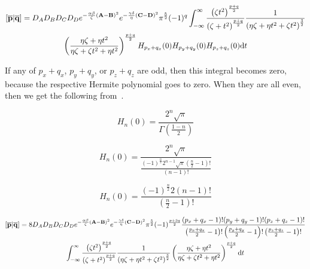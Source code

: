 \begin{multline}
  \left[\overline{\mathbf{p}}\middle|\overline{\mathbf{q}}\right] = D_AD_BD_CD_D e^{-\frac{\alpha\beta}{\zeta}\left(\mathbf{A} - \mathbf{B}\right)^2}e^{-\frac{\gamma\delta}{\eta}\left(\mathbf{C} - \mathbf{D}\right)^2}\pi^{\frac{5}{2}}(-1)^q\int_{-\infty}^\infty \frac{\left(\zeta t^2\right)^{\frac{p + q}{2}}}{\left(\zeta + t^2\right)^{\frac{p + q}{2}}} \frac{1}{\left(\eta\zeta + \eta t^2 + \zeta t^2\right)^{\frac{3}{2}}}\\
  \left(\frac{\eta\zeta + \eta t^2}{\eta\zeta + \zeta t^2 + \eta t^2}\right)^{\frac{p + q}{2}}H_{p_x + q_x}(0)H_{p_y + q_y}(0)H_{p_z + q_z}(0)\mathrm{d} t
\end{multline}

If any of $p_x + q_x$, $p_y + q_y$, or $p_z + q_z$ are odd, then this integral becomes zero, because the respective Hermite polynomial goes to zero. When they are all even, then we get the following from~\cite{wolfram-hermite}.

\begin{equation}
  H_n(0) = \frac{2^n\sqrt{\pi}}{\Gamma\left(\frac{1 - n}{2}\right)}
\end{equation}

\begin{equation}
  H_n(0) = \frac{2^n\sqrt{\pi}}{\frac{(-1)^{\frac{n}{2}}2^{n - 1}\sqrt{\pi}\left(\frac{n}{2} - 1\right)!}{\left(n - 1\right)!}}
\end{equation}

\begin{equation}
  H_n(0) = \frac{(-1)^{\frac{n}{2}}2(n - 1)!}{\left(\frac{n}{2} - 1\right)!}
\end{equation}

\begin{multline}
  \left[\overline{\mathbf{p}}\middle|\overline{\mathbf{q}}\right] = 8D_AD_BD_CD_D e^{-\frac{\alpha\beta}{\zeta}\left(\mathbf{A} - \mathbf{B}\right)^2}e^{-\frac{\gamma\delta}{\eta}\left(\mathbf{C} - \mathbf{D}\right)^2}\pi^{\frac{5}{2}}(-1)^{\frac{p + 3q}{2}}\frac{(p_x + q_x - 1)!(p_y + q_y - 1)!(p_z + q_z - 1)!}{\left(\frac{p_x + q_x}{2} - 1\right)!\left(\frac{p_y + q_y}{2} - 1\right)!\left(\frac{p_z + q_z}{2} - 1\right)!}\\
  \int_{-\infty}^\infty \frac{\left(\zeta t^2\right)^{\frac{p + q}{2}}}{\left(\zeta + t^2\right)^{\frac{p + q}{2}}} \frac{1}{\left(\eta\zeta + \eta t^2 + \zeta t^2\right)^{\frac{3}{2}}}\left(\frac{\eta\zeta + \eta t^2}{\eta\zeta + \zeta t^2 + \eta t^2}\right)^{\frac{p + q}{2}}\mathrm{d} t
\end{multline}

